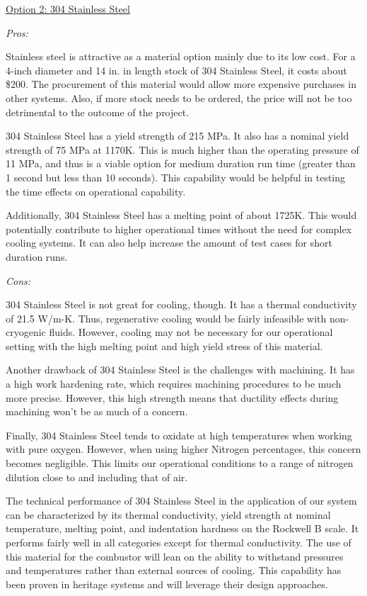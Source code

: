 \noindent\underline{Option 2: 304 Stainless Steel}

\noindent\textit{Pros:}

Stainless steel is attractive as a material option mainly due to its low cost. For a 4-inch diameter and 14 in. in length stock of 304 Stainless Steel, it costs about \$200. The procurement of this material would allow more expensive purchases in other systems. Also, if more stock needs to be ordered, the price will not be too detrimental to the outcome of the project.

304 Stainless Steel has a yield strength of 215 MPa. It also has a nominal yield strength of 75 MPa at 1170K. This is much higher than the operating pressure of 11 MPa, and thus is a viable option for medium duration run time (greater than 1 second but less than 10 seconds). This capability would be helpful in testing the time effects on operational capability.

Additionally, 304 Stainless Steel has a melting point of about 1725K. This would potentially contribute to higher operational times without the need for complex cooling systems. It can also help increase the amount of test cases for short duration runs.

\noindent\textit{Cons:}

304 Stainless Steel is not great for cooling, though. It has a thermal conductivity of 21.5 W/m-K. Thus, regenerative cooling would be fairly infeasible with non-cryogenic fluids. However, cooling may not be necessary for our operational setting with the high melting point and high yield stress of this material.

Another drawback of 304 Stainless Steel is the challenges with machining. It has a high work hardening rate, which requires machining procedures to be much more precise. However, this high strength means that ductility effects during machining won’t be as much of a concern.

Finally, 304 Stainless Steel tends to oxidate at high temperatures when working with pure oxygen. However, when using higher Nitrogen percentages, this concern becomes negligible. This limits our operational conditions to a range of nitrogen dilution close to and including that of air.

The technical performance of 304 Stainless Steel in the application of our system can be characterized by its thermal conductivity, yield strength at nominal temperature, melting point, and indentation hardness on the Rockwell B scale. It performs fairly well in all categories except for thermal conductivity. The use of this material for the combustor will lean on the ability to withstand pressures and temperatures rather than external sources of cooling. This capability has been proven in heritage systems and will leverage their design approaches.

